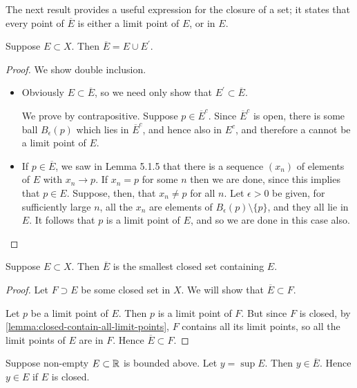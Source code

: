 The next result provides a useful expression for the closure of a set; it states that every point of $\overline{E}$ is either a limit point of $E$, or in $E$.

\begin{lemma}
Suppose $E\subset X$. Then $\overline{E}=E\cup E^\prime$.
\end{lemma}

\begin{proof}
We show double inclusion.
\begin{itemize}
\item {} Obviously $E\subset\overline{E}$, so we need only show that $E^\prime\subset\overline{E}$. 

We prove by contrapositive. Suppose $p\in\overline{E}^c$. Since $\overline{E}^c$ is open, there is some ball $B_\epsilon(p)$ which lies in $\overline{E}^c$, and hence also in $E^c$, and therefore a cannot be a limit point of $E$.

\item {} If $p\in\overline{E}$, we saw in Lemma 5.1.5 that there is a sequence  $(x_n)$ of elements of $E$ with $x_n\to p$. If $x_n=p$ for some $n$ then we are done, since this implies that $p\in E$. Suppose, then, that $x_n\neq p$ for all $n$. Let $\epsilon>0$ be given, for sufficiently large $n$, all the $x_n$ are elements of $B_\epsilon(p)\setminus\{p\}$, and they all lie in $E$. It follows that $p$ is a limit point of $E$, and so we are done in this case also.
\end{itemize}
\end{proof}

\begin{lemma}
Suppose $E\subset X$. Then $\overline{E}$ is the smallest closed set containing $E$.
\end{lemma}

\begin{proof}
Let $F\supset E$ be some closed set in $X$. We will show that $\overline{E}\subset F$.

Let $p$ be a limit point of $E$. Then $p$ is a limit point of $F$. But since $F$ is closed, by \ref{lemma:closed-contain-all-limit-points}, $F$ contains all its limit points, so all the limit points of $E$ are in $F$. Hence $\overline{E}\subset F$.
\end{proof}

\begin{lemma}\label{lemma:closure-sup}
Suppose non-empty $E\subset\mathbb R$ is bounded above. Let $y=\sup E$. Then $y\in\overline{E}$. Hence $y\in E$ if $E$ is closed.
\end{lemma}

